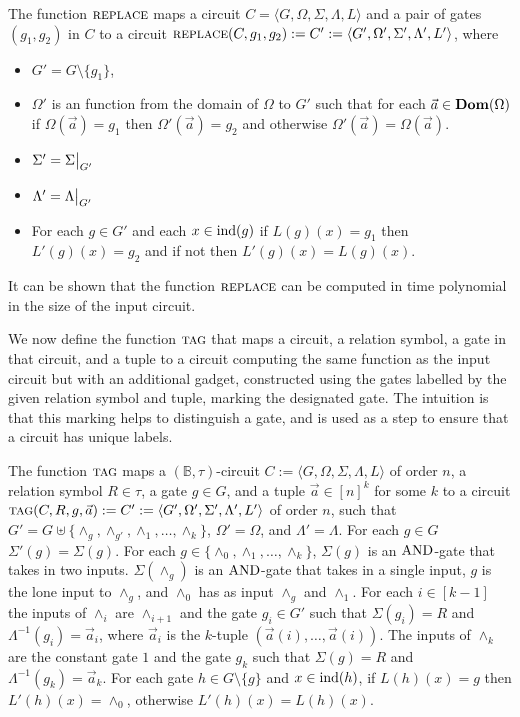 \documentclass[../paper.tex]{subfiles}
\begin{document}
\begin{definition}
  The function ${\normalfont\textsc{replace}}$ maps a circuit $C = \langle G, \Omega, \Sigma,
  \Lambda, L\rangle$ and a pair of gates $(g_1, g_2)$ in $C$ to a circuit
  ${\normalfont\textsc{replace}}(C, g_1, g_2) := C' := \langle G', \Omega', \Sigma', \Lambda', L'
  \rangle$, where
  \begin{itemize}
    \setlength\itemsep{0mm}
  \item $G' = G \setminus \{g_1\}$,
  \item $\Omega'$ is an function from the domain of $\Omega$ to $G'$ such that
    for each $\vec{a} \in \text{\textbf{Dom}}(\Omega)$ if $\Omega(\vec{a}) = g_1$ then
    $\Omega'(\vec{a}) = g_2$ and otherwise $\Omega'(\vec{a}) = \Omega(\vec{a})$.
  \item $\Sigma' = \restr{\Sigma}{G'}$
  \item $\Lambda' = \restr{\Lambda}{G'}$
  \item For each $g \in G'$ and each $x \in \text{\upshape ind}(g)$ if $L(g)(x) = g_1$ then
    $L'(g)(x) = g_2$ and if not then $L'(g)(x) = L(g)(x)$.
  \end{itemize}
\end{definition}

It can be shown that the function ${\normalfont\textsc{replace}}$ can be computed in time
polynomial in the size of the input circuit.

We now define the function ${\normalfont\textsc{tag}}$ that maps a circuit, a relation symbol, a
gate in that circuit, and a tuple to a circuit computing the same function as
the input circuit but with an additional gadget, constructed using the gates
labelled by the given relation symbol and tuple, marking the designated gate.
The intuition is that this marking helps to distinguish a gate, and is used as a
step to ensure that a circuit has unique labels.

\begin{definition}
  The function ${\normalfont\textsc{tag}}$ maps a $(\mathbb{B}, \tau)$-circuit $C := \langle G,
  \Omega, \Sigma, \Lambda, L \rangle$ of order $n$, a relation symbol $R \in
  \tau$, a gate $g \in G$, and a tuple $\vec{a} \in [n]^k$ for some $k$ to a
  circuit ${\normalfont\textsc{tag}}(C, R, g, \vec{a}) := C' := \langle G', \Omega', \Sigma',
  \Lambda', L'\rangle$ of order $n$, such that $G' = G \uplus \{\land_g,
  \land_{g'}, \land_1, \ldots , \land_k\}$, $\Omega' = \Omega$, and $\Lambda' =
  \Lambda$. For each $g \in G$ $\Sigma'(g) = \Sigma(g)$. For each $g \in
  \{\land_0, \land_1, \ldots , \land_k \}$, $\Sigma(g)$ is an $\text{\upshape AND}$-gate that
  takes in two inputs. $\Sigma(\land_g)$ is an $\text{\upshape AND}$-gate that takes in a
  single input, $g$ is the lone input to $\land_g$, and $\land_0$ has as input
  $\land_g$ and $\land_1$. For each $i \in [k-1]$ the inputs of $\land_i$ are
  $\land_{i+1}$ and the gate $g_i \in G'$ such that $\Sigma(g_i) = R$ and
  $\Lambda^{-1}(g_i) = \vec{a}_i$, where $\vec{a}_i$ is the $k$-tuple
  $(\vec{a}(i), \ldots, \vec{a}(i))$. The inputs of $\land_k$ are the constant
  gate $1$ and the gate $g_k$ such that $\Sigma(g) = R$ and $\Lambda^{-1}(g_k) =
  \vec{a}_k$. For each gate $h \in G \setminus \{g\}$ and $x \in \text{\upshape ind}(h)$, if
  $L(h)(x) = g$ then $L'(h)(x) = \land_0$, otherwise $L'(h)(x) = L(h)(x)$.
\end{definition}
\end{document}

